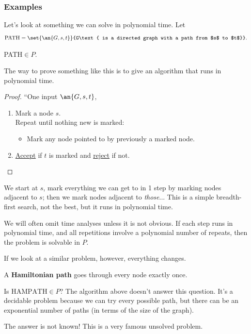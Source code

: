 \subsubsection{Examples}
Let's look at something we can solve in polynomial time. 
Let 
\[
\text{PATH}=\set{\an{G,s,t}}{G\text{ is a directed graph with a path from $s$ to $t$}}.
\]
\begin{thm}
PATH$\in P$.
\end{thm}
The way to prove something like this is to give an algorithm that runs in polynomial time.
\begin{proof}
``One input $\an{G,s,t}$,
\begin{enumerate}
\item
Mark a node $s$.\\
Repeat until nothing new is marked:
\begin{itemize}
\item
Mark any node pointed to by previously a marked node.
\end{itemize}
\item
\ul{Accept} if $t$ is marked and \ul{reject} if not.
\end{enumerate}
\end{proof}

We start at $s$, mark everything we can get to in 1 step by marking nodes adjacent to $s$; then we mark nodes adjacent to \emph{those}... This is a simple breadth-first search, not the best, but it runs in polynomial time.

We will often omit time analyses unless it is not obvious.
If each step runs in polynomial time, and all repetitions involve a  polynomial number of repeats, then the problem is solvable in $P$.

If we look at a similar problem, however, everything changes.

\begin{df}
A \textbf{Hamiltonian path} goes through every node exactly once.
\end{df}
Is $\text{HAMPATH}\in P$? The algorithm above doesn't answer this question. It's a decidable problem because we can try every possible path, but there can be an exponential number of paths (in terms of the size of the graph).

The answer is not known! This is a very famous unsolved problem. 
